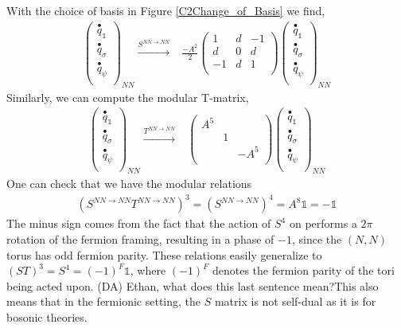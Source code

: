 \documentclass[12pt,a4paper]{article}
\newcounter{arrow}
\newcommand{\ra}{\rightarrow}
\newcommand{\unit}{\mathds{1}}
\newcommand{\dave}[1]{{\color{ao(english)}\footnotesize{(DA) #1}}}
\begin{document}
With the choice of basis in Figure \ref{C2Change_of_Basis} we find,
\begin{align}
\left( \begin{matrix}
\overset{\bullet}{q}_\unit\\
\overset{\bullet}{q}_\sigma\\
\overset{\bullet}{q}_\psi\\
\end{matrix} \right)_{NN} 
\xrightarrow{S^{NN \rightarrow NN}} &\frac{-A^2}{2} \left( \begin{matrix}
1& d&-1\\
d&0&d\\
-1& d&1\\
\end{matrix} \right)
\left( \begin{matrix}
\overset{\bullet}{q}_\unit\\
\overset{\bullet}{q}_\sigma\\
\overset{\bullet}{q}_\psi\\
\end{matrix} \right)_{NN}
\label{NNSmatrix}
\end{align}
Similarly, we can compute the modular T-matrix, 
\begin{align}
\left( \begin{matrix}
\overset{\bullet}{q}_\unit\\
\overset{\bullet}{q}_\sigma\\
\overset{\bullet}{q}_\psi\\
\end{matrix} \right)_{NN} 
\xrightarrow{T^{NN \rightarrow NN}} &\left( \begin{matrix}
A^5& &\\
&1&\\
&&-A^5\\
\end{matrix} \right)
\left( \begin{matrix}
\overset{\bullet}{q}_\unit\\
\overset{\bullet}{q}_\sigma\\
\overset{\bullet}{q}_\psi\\
\end{matrix} \right)_{NN}
\end{align}
One can check that we have the modular relations
\begin{align}
 (S^{NN\ra NN}T^{NN\ra NN})^3 = (S^{NN \ra NN})^4= A^{8}\unit = -\unit
 \end{align}
The minus sign comes from the fact that the action of $S^4$ on performs a $2\pi$ rotation 
of the fermion framing, resulting in a phase of $-1$, since the $(N,N)$ torus has odd fermion parity. 
These relations easily generalize to $(ST)^3=S^4=(-1)^F\unit$, where $(-1)^F$ denotes the 
fermion parity of the tori being acted upon.
\dave{Ethan, what does this last sentence mean?}This also means that in the fermionic setting, 
the $S$ matrix is not self-dual as it is for bosonic theories.
\end{document}
